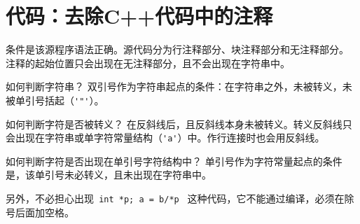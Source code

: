 \section{代码：去除C++代码中的注释}

条件是该源程序语法正确。源代码分为行注释部分、块注释部分和无注释部分。
注释的起始位置只会出现在无注释部分，且不会出现在字符串中。

如何判断字符串？
双引号作为字符串起点的条件：在字符串之外，未被转义，未被单引号括起（\verb$'"'$）。

如何判断字符是否被转义？
在反斜线后，且反斜线本身未被转义。转义反斜线只会出现在字符串或单字符常量结构（\verb$'a'$）中。作行连接时也会用反斜线。

如何判断字符是否出现在单引号字符结构中？
单引号作为字符常量起点的条件是，该单引号未必转义，且未出现在字符串中。

另外，不必担心出现\verb$ int *p; a = b/*p $ 这种代码，它不能通过编译，必须在除号后面加空格。

